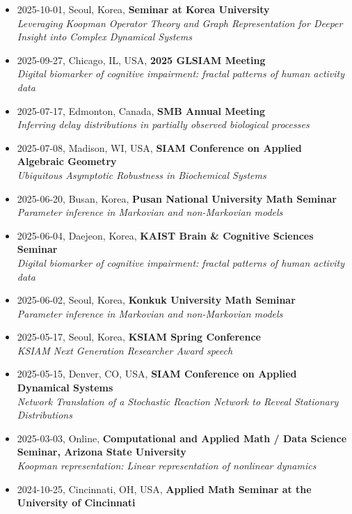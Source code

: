 \documentclass[margin,line]{res}
\begin{document}
\begin{resume}
\begin{itemize}[leftmargin=0pt, label={}]
    \textit{Ubiquitous Asymptotic Robustness in Biochemical Systems}
    \item 2025-10-01, Seoul, Korea, \textbf{Seminar at Korea University} \\
    \textit{Leveraging Koopman Operator Theory and Graph Representation for Deeper Insight into Complex Dynamical Systems}
    \item 2025-09-27, Chicago, IL, USA, \textbf{2025 GLSIAM Meeting} \\
    \textit{Digital biomarker of cognitive impairment: fractal patterns of human activity data}
    \item 2025-07-17, Edmonton, Canada, \textbf{SMB Annual Meeting} \\
    \textit{Inferring delay distributions in partially observed biological processes}
    \item 2025-07-08, Madison, WI, USA, \textbf{SIAM Conference on Applied Algebraic Geometry} \\
    \textit{Ubiquitous Asymptotic Robustness in Biochemical Systems}
    \item 2025-06-20, Busan, Korea, \textbf{Pusan National University Math Seminar} \\
    \textit{Parameter inference in Markovian and non-Markovian models}
    \item 2025-06-04, Daejeon, Korea, \textbf{KAIST Brain \& Cognitive Sciences Seminar} \\
    \textit{Digital biomarker of cognitive impairment: fractal patterns of human activity data}
    \item 2025-06-02, Seoul, Korea, \textbf{Konkuk University Math Seminar} \\
    \textit{Parameter inference in Markovian and non-Markovian models}
    \item 2025-05-17, Seoul, Korea, \textbf{KSIAM Spring Conference} \\
    \textit{KSIAM Next Generation Researcher Award speech}
    \item 2025-05-15, Denver, CO, USA, \textbf{SIAM Conference on Applied Dynamical Systems} \\
    \textit{Network Translation of a Stochastic Reaction Network to Reveal Stationary Distributions}
    \item 2025-03-03, Online, \textbf{Computational and Applied Math / Data Science Seminar, Arizona State University} \\
    \textit{Koopman representation: Linear representation of nonlinear dynamics}
    \item 2024-10-25, Cincinnati, OH, USA, \textbf{Applied Math Seminar at the University of Cincinnati} \\

\end{itemize}
\end{resume}
\end{document}
